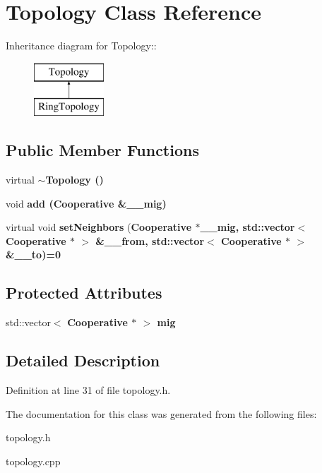 \section{Topology Class Reference}
\label{class_topology}
Inheritance diagram for Topology::\begin{figure}[H]
\begin{center}
\leavevmode
\includegraphics[height=2cm]{class_topology}
\end{center}
\end{figure}
\subsection*{Public Member Functions}
\begin{CompactItemize}
\item 
virtual \bf{$\sim$Topology} ()\label{class_topology_3e447669757c8311c7f6f8edc705abf2}

\item 
void \bf{add} (\bf{Cooperative} \&\_\-\_\-mig)\label{class_topology_62bc46d8c20fdc71dad9e7c7a0d7aded}

\item 
virtual void \textbf{set\-Neighbors} (\bf{Cooperative} $\ast$\_\-\_\-mig, std::vector$<$ \bf{Cooperative} $\ast$ $>$ \&\_\-\_\-from, std::vector$<$ \bf{Cooperative} $\ast$ $>$ \&\_\-\_\-to)=0\label{class_topology_86c006ad698649b2ba5016a5ddd619ce}

\end{CompactItemize}
\subsection*{Protected Attributes}
\begin{CompactItemize}
\item 
std::vector$<$ \bf{Cooperative} $\ast$ $>$ \bf{mig}\label{class_topology_247a2faa8568b678f0b7b11e62c7812c}

\end{CompactItemize}


\subsection{Detailed Description}




Definition at line 31 of file topology.h.

The documentation for this class was generated from the following files:\begin{CompactItemize}
\item 
topology.h\item 
topology.cpp\end{CompactItemize}
